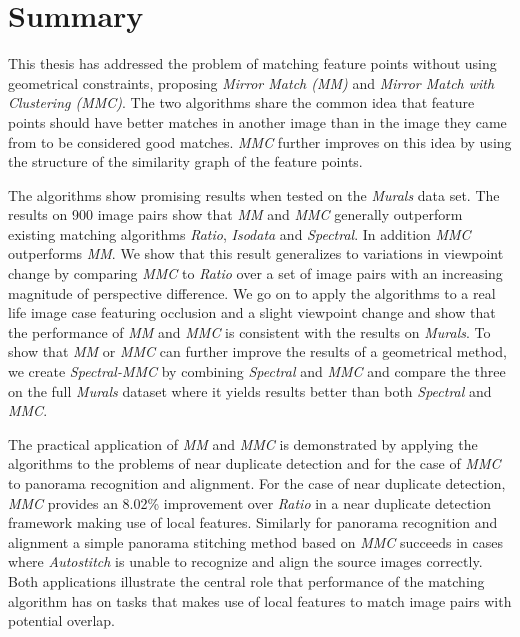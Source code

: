 \documentclass{article}
\begin{document}
\section{Summary}
\label{S:Summary}

This thesis has addressed the problem of matching feature points without 
using geometrical constraints, proposing \emph{Mirror Match (MM)} and 
\emph{Mirror Match with Clustering (MMC)}.  The two algorithms share the 
common idea that feature points should have better matches in another 
image than in the image they came from to be considered good matches.  
\emph{MMC} further improves on this idea by using the structure of the 
similarity graph of the feature points. 

The algorithms show promising results when tested on the \emph{Murals} 
data set. The results on 900 image pairs show that \emph{MM} and 
\emph{MMC} generally outperform existing matching algorithms 
\emph{Ratio}, \emph{Isodata} and \emph{Spectral}. In addition \emph{MMC} 
outperforms \emph{MM}.  We show that this result generalizes to 
variations in viewpoint change by comparing \emph{MMC} to \emph{Ratio} 
over a set of image pairs with an increasing magnitude of perspective 
difference. We go on to apply the algorithms to a real life image case 
featuring occlusion and a slight viewpoint change and show that the 
performance of \emph{MM} and \emph{MMC} is consistent with the results 
on \emph{Murals}. To show that \emph{MM} or \emph{MMC}
can further improve the results of a geometrical method, we create 
\emph{Spectral-MMC} by combining \emph{Spectral} and \emph{MMC} and 
compare the three on the full \emph{Murals} dataset where it yields 
results better than both \emph{Spectral} and \emph{MMC}.

The practical application of \emph{MM} and \emph{MMC} is demonstrated by 
applying the algorithms to the problems of near duplicate detection and 
for the case of \emph{MMC} to panorama recognition and alignment. For 
the case of near duplicate detection, \emph{MMC} provides an 8.02\% 
improvement over \emph{Ratio} in a near duplicate detection framework 
making use of local features. Similarly for panorama recognition and 
alignment a simple panorama stitching method based on \emph{MMC} 
succeeds in cases where \emph{Autostitch} is unable to recognize and 
align the source images correctly. Both applications illustrate the 
central role that performance of the matching algorithm has on tasks 
that makes use of local features to match image pairs with potential 
overlap.
%



\end{document}
